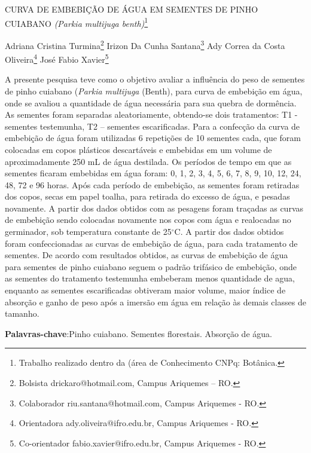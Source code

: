 \documentclass[article,12pt,onesidea,4paper,english,brazil]{abntex2}
\begin{document}
	
	
	\frenchspacing 
	
	\begin{center}
		\LARGE CURVA DE EMBEBIÇÃO DE ÁGUA EM SEMENTES DE PINHO CUIABANO
		\textit{(Parkia multijuga benth)}\footnote{Trabalho realizado dentro da (área de Conhecimento CNPq: Botânica.}
		
		\normalsize
	Adriana Cristina Turmina\footnote{Bolsista drickaro@hotmail.com, Campus Ariquemes – RO.} 
	Irizon Da Cunha Santana\footnote{Colaborador riu.santana@hotmail.com, Campus Ariquemes - RO.} 
		Ady Correa da Costa Oliveira\footnote{Orientadora ady.oliveira@ifro.edu.br, Campus Ariquemes - RO.} 
		José Fabio
		Xavier\footnote{Co-orientador fabio.xavier@ifro.edu.br, Campus Ariquemes - RO.} 
	\end{center}
	
	\noindent A presente pesquisa teve como o objetivo avaliar a influência do peso de sementes
	de pinho cuiabano (\textit{Parkia multijuga} (Benth), para curva de embebição em água,
	onde se avaliou a quantidade de água necessária para sua quebra de dormência. As sementes foram separadas aleatoriamente, obtendo-se dois tratamentos: T1 -
	sementes testemunha, T2 – sementes escarificadas. Para a confecção da curva de embebição de água foram utilizadas 6 repetições de 10 sementes cada, que foram colocadas em copos plásticos descartáveis e embebidas em um volume de aproximadamente 250 mL de água destilada. Os períodos de tempo em que as
	sementes ficaram embebidas em água foram: 0, 1, 2, 3, 4, 5, 6, 7, 8, 9, 10, 12, 24, 48, 72 e 96 horas. Após cada período de embebição, as sementes foram retiradas dos copos, secas em papel toalha, para retirada do excesso de água, e pesadas novamente. A partir dos dados obtidos com as pesagens foram traçadas as curvas
	de embebição sendo colocadas novamente nos copos com água e realocadas no germinador, sob temperatura constante de 25$^\circ$C. A partir dos dados obtidos foram
	confeccionadas as curvas de embebição de água, para cada tratamento de sementes. De acordo com resultados obtidos, as curvas de embebição de água para sementes de pinho cuiabano seguem o padrão trifásico de embebição, onde as
	sementes do tratamento testemunha embeberam menos quantidade de agua, enquanto as sementes escarificadas obtiveram maior volume, maior índice de absorção e ganho de peso após a imersão em água em relação às demais classes de tamanho.
	
	\vspace{\onelineskip}
	
	\noindent
	\textbf{Palavras-chave}:Pinho cuiabano. Sementes florestais. Absorção de água.
	
\end{document}
